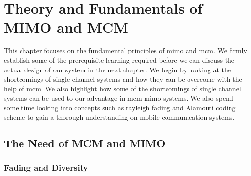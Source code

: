 \chapter{Theory and Fundamentals of MIMO and MCM}
This chapter focuses on the fundamental principles of \acrshort{mimo} and \acrshort{mcm}. We firmly establish some of the prerequisite learning required before we can discuss the actual design of our system in the next chapter. We begin by looking at the shortcomings of single channel systems and how they can be overcome with the help of \acrshort{mcm}. We also highlight how some of the shortcomings of single channel systems can be used to our advantage in \acrshort{mcm}-\acrshort{mimo} systems. We also spend some time looking into concepts such as \gls{rayleigh fading} and Alamouti coding scheme to gain a thorough understanding on mobile communication systems.

\section{The Need of MCM and MIMO}
\subsection{Fading and Diversity}
